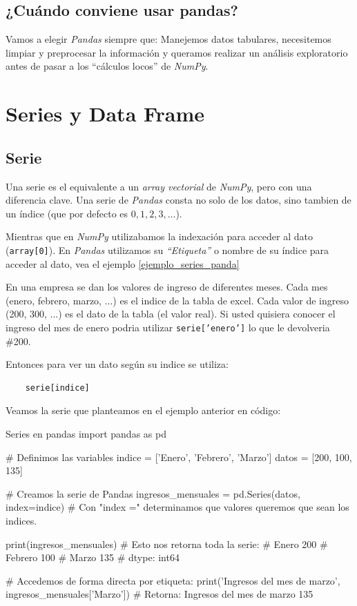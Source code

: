 \subsection{¿Cuándo conviene usar pandas?}

Vamos a elegir \textit{Pandas} siempre que: Manejemos datos tabulares, necesitemos limpiar y preprocesar la información y queramos realizar un análisis exploratorio antes de pasar a los ``cálculos locos'' de \textit{NumPy}.


\section{Series y Data Frame}

\subsection{Serie}

Una serie es el equivalente a un \textit{array vectorial} de \textit{NumPy}, pero con una diferencia clave. Una serie de \textit{Pandas} consta no solo de los datos, sino tambien de un índice (que por defecto es \(0,1,2,3,\dots\)).  

Mientras que en \textit{NumPy} utilizabamos la indexación para acceder al dato (\texttt{array[0]}). En \textit{Pandas} utilizamos su \textit{``Etiqueta''} o nombre de su índice para acceder al dato, vea el ejemplo \ref{ejemplo_series_panda}

\begin{ejemplo}
    \label{ejemplo_series_panda}
    En una empresa se dan los valores de ingreso de diferentes meses. Cada mes (enero, febrero, marzo, ...) es el indice de la tabla de excel. Cada valor de ingreso (200, 300, ...) es el dato de la tabla (el valor real). Si usted quisiera conocer el ingreso del mes de enero podria utilizar \texttt{serie['enero']} lo que le devolveria \#200.
\end{ejemplo}

Entonces para ver un dato según su indice se utiliza:
\begin{verbatim}
    serie[indice]
\end{verbatim}

Veamos la serie que planteamos en el ejemplo anterior en código:
\begin{pycode}{Series en pandas}
import pandas as pd

# Definimos las variables
indice = ['Enero', 'Febrero', 'Marzo']
datos = [200, 100, 135]

# Creamos la serie de Pandas
ingresos_mensuales = pd.Series(datos, index=indice) # Con "index =" determinamos que valores queremos que sean los indices. 

print(ingresos_mensuales) # Esto nos retorna toda la serie:
# Enero      200
# Febrero    100
# Marzo      135
# dtype: int64

# Accedemos de forma directa por etiqueta:
print('Ingresos del mes de marzo', ingresos_mensuales['Marzo']) # Retorna: Ingresos del mes de marzo 135
\end{pycode}

